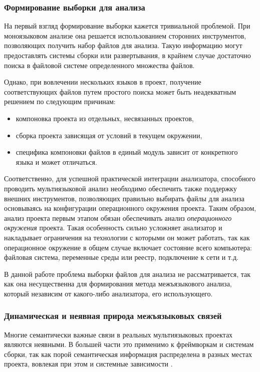 \subsubsection{Формирование выборки для анализа}

На первый взгляд формирование выборки кажется тривиальной проблемой. При моноязыковом анализе она
решается использованием сторонних инструментов, позволяющих получить набор файлов для анализа.
Такую информацию могут предоставлять системы сборки или развертывания, в крайнем случае достаточно
поиска в файловой системе определенного множества файлов.

Однако, при вовлечении нескольких языков в проект, получение соответствующих файлов путем простого
поиска может быть неадекватным решением по следующим причинам:
\begin{itemize}
    \item компоновка проекта из отдельных, несвязанных проектов,
    \item сборка проекта зависящая от условий в текущем окружении,
    \item специфика компоновки файлов в единый модуль зависит от конкретного языка и может отличаться.
\end{itemize}

Соответственно, для успешной практической интеграции анализатора, способного проводить мультиязыковой анализ
необходимо обеспечить также поддержку внешних инструментов, позволяющих правильно выбирать файлы для
анализа основываясь на конфигурации операционного окружения проекта. Таким образом, анализ проекта
первым этапом обязан обеспечивать анализ \textit{операционного окружения} проекта. Такая особенность
сильно усложняет анализатор и накладывает ограничения на технологии с которыми он может работать, так
как операционное окружение в общем случае включает состояние всего компьютера: файловая система, переменные
среды или реестр, подключение к сети и т.д. 

В данной работе проблема выборки файлов для анализа
не рассматривается, так как она несущественна для формирования метода межъязыкового анализа, 
который независим от какого-либо анализатора, его использующего.

\subsubsection{Динамическая и неявная природа межъязыковых связей}

Многие семантически важные связи в реальных мультиязыковых проектах являются неявными. В большей части это применимо
к фреймворкам и системам сборки, так как порой семантическая информация распределена в разных местах проекта,
вовлекая при этом и системные зависимости \cite{professional-developers} \cite{external-dependencies}.

